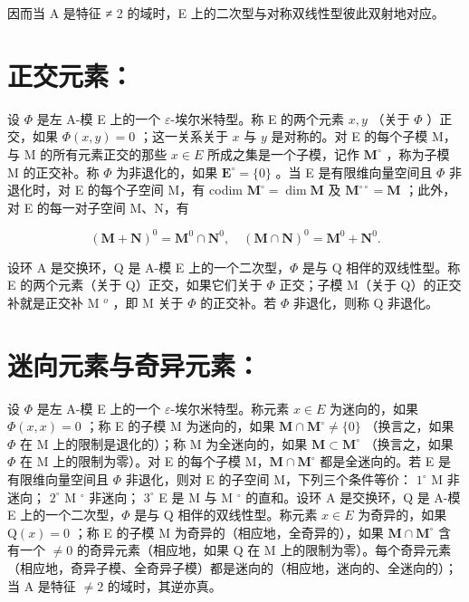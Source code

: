 因而当 A 是特征 ≠ 2 的域时，E 上的二次型与对称双线性型彼此双射地对应。

\section*{正交元素：}

设 \(\Phi\) 是左 A-模 E 上的一个 \(\varepsilon\)-埃尔米特型。称 E 的两个元素 \(x, y\) （关于 \(\Phi\) ）正交，如果 \(\Phi(x, y) = 0\) ；这一关系关于 \(x\) 与 \(y\) 是对称的。对 E 的每个子模 M，与 M 的所有元素正交的那些 \(x \in E\) 所成之集是一个子模，记作 \(\mathbf{M}^{\circ}\) ，称为子模 M 的正交补。称 \(\Phi\) 为非退化的，如果 \(\mathbf{E}^{\circ} = \{0\}\) 。当 E 是有限维向量空间且 \(\Phi\) 非退化时，对 E 的每个子空间 M，有 codim \(\mathbf{M}^{\circ} = \dim \mathbf{M}\) 及 \(\mathbf{M}^{\circ\circ} = \mathbf{M}\) ；此外，对 E 的每一对子空间 M、N，有

\[
(\mathbf {M} + \mathbf {N}) ^ {0} = \mathbf {M} ^ {0} \cap \mathbf {N} ^ {0}, \quad (\mathbf {M} \cap \mathbf {N}) ^ {0} = \mathbf {M} ^ {0} + \mathbf {N} ^ {0}.
\]

设环 A 是交换环，Q 是 A-模 E 上的一个二次型，\(\Phi\) 是与 Q 相伴的双线性型。称 E 的两个元素（关于 Q）正交，如果它们关于 \(\Phi\) 正交；子模 M（关于 Q）的正交补就是正交补 M \(^{o}\) ，即 M 关于 \(\Phi\) 的正交补。若 \(\Phi\) 非退化，则称 Q 非退化。

\section*{迷向元素与奇异元素：}

设 \(\Phi\) 是左 A-模 E 上的一个 \(\varepsilon\)-埃尔米特型。称元素 \(x \in E\) 为迷向的，如果 \(\Phi(x, x) = 0\) ；称 E 的子模 M 为迷向的，如果 \(\mathbf{M} \cap \mathbf{M}^{\circ} \neq \{0\}\) （换言之，如果 \(\Phi\) 在 M 上的限制是退化的）；称 M 为全迷向的，如果 \(\mathbf{M} \subset \mathbf{M}^{\circ}\) （换言之，如果 \(\Phi\) 在 M 上的限制为零）。对 E 的每个子模 M，\(\mathbf{M} \cap \mathbf{M}^{\circ}\) 都是全迷向的。若 E 是有限维向量空间且 \(\Phi\) 非退化，则对 E 的子空间 M，下列三个条件等价： \(1^{\circ}\) M 非迷向； \(2^{\circ}\) M \(^{\circ}\) 非迷向； \(3^{\circ}\) E 是 M 与 M \(^{\circ}\) 的直和。设环 A 是交换环，Q 是 A-模 E 上的一个二次型，\(\Phi\) 是与 Q 相伴的双线性型。称元素 \(x \in E\) 为奇异的，如果 \(\mathrm{Q}(x) = 0\) ；称 E 的子模 M 为奇异的（相应地，全奇异的），如果 \(\mathbf{M} \cap \mathbf{M}^{\circ}\) 含有一个 \(\neq 0\) 的奇异元素（相应地，如果 Q 在 M 上的限制为零）。每个奇异元素（相应地，奇异子模、全奇异子模）都是迷向的（相应地，迷向的、全迷向的）；当 A 是特征 \(\neq 2\) 的域时，其逆亦真。
